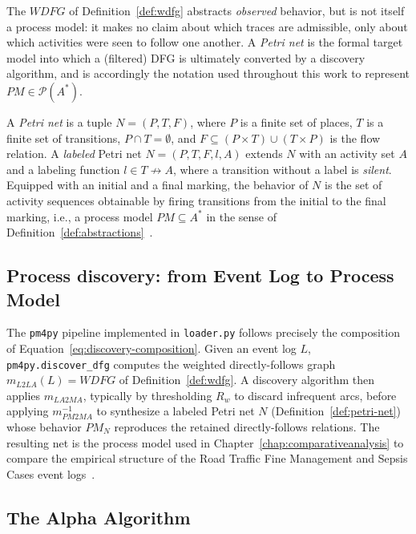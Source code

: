 The $WDFG$ of Definition~\ref{def:wdfg} abstracts \emph{observed} behavior,
but is not itself a process model: it makes no claim about which traces are
admissible, only about which activities were seen to follow one another. A
\emph{Petri net} is the formal target model into which a (filtered) DFG is
ultimately converted by a discovery algorithm, and is accordingly the
notation used throughout this work to represent
$PM \in \mathcal{P}(A^{*})$.

\begin{definition}
	\label{def:petri-net}
	A \emph{Petri net} is a tuple $N = (P, T, F)$, where $P$ is a finite set of
	places, $T$ is a finite set of transitions, $P \cap T = \emptyset$, and
	$F \subseteq (P \times T) \cup (T \times P)$ is the flow relation. A
	\emph{labeled} Petri net $N = (P, T, F, l, A)$ extends $N$ with an activity
	set $A$ and a labeling function $l \in T \not\to A$, where a transition
	without a label is \emph{silent}. Equipped with an initial and a final
	marking, the behavior of $N$ is the set of activity sequences obtainable
	by firing transitions from the initial to the final marking, i.e., a
	process model $PM \subseteq A^{*}$ in the sense of
	Definition~\ref{def:abstractions}~\cite{aalst2018reconstruction}.
\end{definition}

\subsection{Process discovery: from Event Log to Process Model}
\label{subsec:dfg-to-petri}

The \texttt{pm4py} pipeline implemented in \texttt{loader.py} follows
precisely the composition of Equation~\eqref{eq:discovery-composition}.
Given an event log $L$, \texttt{pm4py.discover\_dfg} computes the weighted
directly-follows graph $m_{L2LA}(L) = WDFG$ of Definition~\ref{def:wdfg}. A
discovery algorithm then applies $m_{LA2MA}$, typically by thresholding
$R_w$ to discard infrequent arcs, before applying $m_{PM2MA}^{-1}$ to
synthesize a labeled Petri net $N$ (Definition~\ref{def:petri-net}) whose
behavior $PM_N$ reproduces the retained directly-follows relations. The
resulting net is the process model used in
Chapter~\ref{chap:comparativeanalysis} to compare the empirical structure of
the Road Traffic Fine Management and Sepsis Cases event
logs~\cite{aalst2018reconstruction}.

\subsection{The Alpha Algorithm}
\label{subsec:alpha-algorithm}

